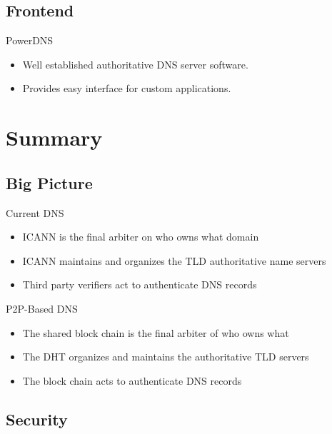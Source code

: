 \documentclass[11pt]{beamer}
\begin{document}
\subsection{Frontend}
\begin{frame}{PowerDNS}
\begin{itemize}
	\item Well established authoritative DNS server software.
	
	\item Provides easy interface for custom applications.
	
\end{itemize}
\end{frame}

\section{Summary}

\subsection{Big Picture}

\begin{frame}{Current DNS}

	\begin{itemize}
		\item ICANN is the final arbiter on who owns what domain
		\item ICANN maintains and organizes the TLD authoritative name servers
		\item Third party verifiers act to authenticate DNS records
	
	\end{itemize}


\end{frame}



\begin{frame}{P2P-Based DNS}

	\begin{itemize}
		\item The shared block chain is the final arbiter of who owns what
		\item The DHT organizes and maintains the authoritative TLD servers
		\item The block chain acts to authenticate DNS records
	\end{itemize}
\end{frame}

\subsection{Security}
\end{document}
